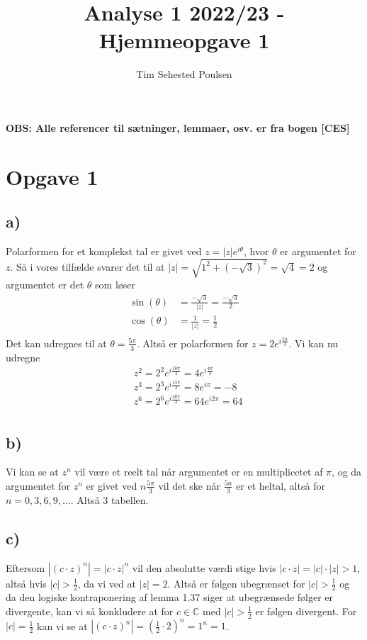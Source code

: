 \documentclass{article}
\title{Analyse 1 2022/23 - Hjemmeopgave 1}
\author{Tim Sehested Poulsen}
\newcommand{\m}[1]{\mathbb{#1}}
\newcommand{\mC}{\m{C}}
\begin{document}
\textbf{OBS: Alle referencer til sætninger, lemmaer, osv. er fra bogen [CES]}
\section*{Opgave 1}
\subsection*{a)}
Polarformen for et komplekst tal er givet ved $z = |z|e^{i\theta}$, hvor $\theta$ er argumentet for $z$.
Så i vores tilfælde svarer det til at $|z| = \sqrt{1^2 + (-\sqrt{3})^2} = \sqrt{4}= 2$ og argumentet er det $\theta$ som løser
\begin{align*}
\sin(\theta) &= \frac{-\sqrt{3}}{|z|} = \frac{-\sqrt{3}}{2} \\
\cos(\theta) &= \frac{1}{|z|} = \frac{1}{2} \\
\end{align*}
Det kan udregnes til at $\theta = \frac{5\pi}{3}$. Altså er polarformen for $z= 2e^{i\frac{5\pi}{3}}$.
Vi kan nu udregne 
\begin{align*}
    &z^2 = 2^2e^{i\frac{10\pi}{3}} = 4e^{i\frac{4\pi}{3}} \\
    &z^3 = 2^3e^{i\frac{15\pi}{3}} = 8 e^{i\pi} = -8 \\
    &z^6 = 2^6e^{i\frac{30\pi}{3}} = 64 e^{i 2\pi} = 64 \\
\end{align*}
\subsection*{b)}
Vi kan se at $z^n$ vil være et reelt tal når argumentet er en multiplicetet af $\pi$, og da argumentet for 
$z^n$ er givet ved $n\frac{5\pi}{3}$ vil det ske når $\frac{5n}{3}$ er et heltal, altså for $n=0,3,6,9,\dots$. Altså 3 tabellen.

\subsection*{c)}
Eftersom $|(c\cdot z)^n| = |c\cdot z|^n$ vil den absolutte værdi stige hvis $|c \cdot z| = |c| \cdot |z| > 1$, altså hvis $|c| > \frac{1}{2}$, 
da vi ved at $|z| = 2$. Altså er følgen ubegrænset for $|c| > \frac{1}{2}$ og da den logiske kontraponering af lemma 1.37 siger at
ubegrænsede følger er divergente, kan vi så konkludere at for $c \in \mC$ med $|c| > \frac{1}{2}$ er følgen divergent.
For $|c| =\frac{1}{2}$ kan vi se at $|(c \cdot z)^n| = (\frac{1}{2} \cdot 2)^n = 1^n = 1$.
\end{document}
